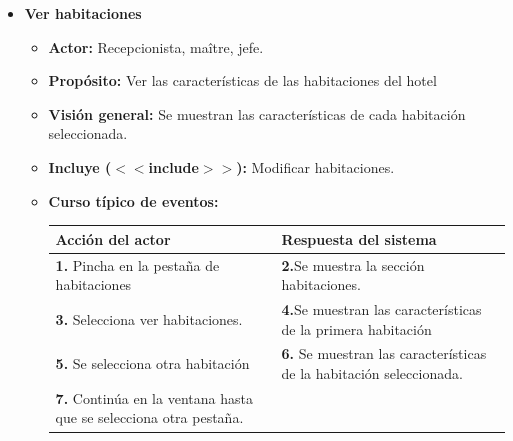 \documentclass[spanish,a4paper,12pt]{report}		%
\begin{document}
\begin{itemize}
	
	\hspace{-2 true cm}
	\item \textbf{Ver habitaciones}
		\begin{itemize}
			\item \textbf{Actor:} Recepcionista, maître, jefe.
			\item \textbf{Propósito: } Ver las características de las habitaciones del hotel
			\item \textbf{Visión general:} Se muestran las características de cada habitación seleccionada.
			\item \textbf{Incluye ($<<$include$>>$):} Modificar habitaciones.
			\item \textbf{Curso típico de eventos:} 	\\
				\begin{tabular}{|p{6cm}||p{6cm}|}
				\hline
				\textbf{Acción del actor} & \textbf{Respuesta del sistema} \\ \hline
				\textbf{1.} Pincha en la pestaña de habitaciones & \textbf{2.}Se muestra la sección habitaciones.\\ \hline 
				\textbf{3.} Selecciona ver habitaciones. & \textbf{4.}Se muestran las características de la primera habitación  \\ \hline
				\textbf{5.} Se selecciona otra habitación & \textbf{6.} Se muestran las características de la habitación seleccionada. \\ \hline
				\textbf{7.} Continúa en la ventana hasta que se selecciona otra pestaña. & \\ \hline
			\end{tabular}
			\\
		\end {itemize}
		

\end{itemize}
\end{document}

